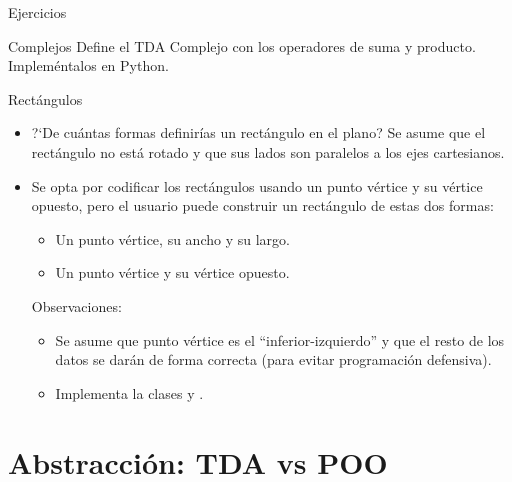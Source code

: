 \documentclass[10pt,envcountsect,spanish]{beamer}
\begin{document}
\begin{frame}{Ejercicios}

\begin{ejercicio}{Complejos}
Define el TDA Complejo con los operadores de suma y producto. Impleméntalos en Python.
\end{ejercicio}


\begin{ejercicio}{Rectángulos}
\begin{itemize}[leftmargin=.1in, rightmargin=.1in]\setlength{\itemsep}{1mm}
\item ?`De cuántas formas definirías un rectángulo en el plano?
Se asume que el rectángulo no está rotado y que sus lados son paralelos a los ejes cartesianos.


\item Se opta por codificar los rectángulos usando un punto vértice y su vértice opuesto, pero el usuario puede construir un rectángulo de estas dos formas:
\begin{itemize}
\item Un punto vértice, su ancho y su largo.
\item Un punto vértice y su vértice opuesto.
\end{itemize}

Observaciones:
\begin{itemize}
\item Se asume que punto vértice es el ``inferior-izquierdo'' y que el resto de los datos se darán de forma correcta (para evitar programación defensiva).
\item Implementa la clases  y .
\end{itemize}

\end{itemize}
\end{ejercicio}

\end{frame}










\section{Abstracción: TDA vs POO}
\end{document}
